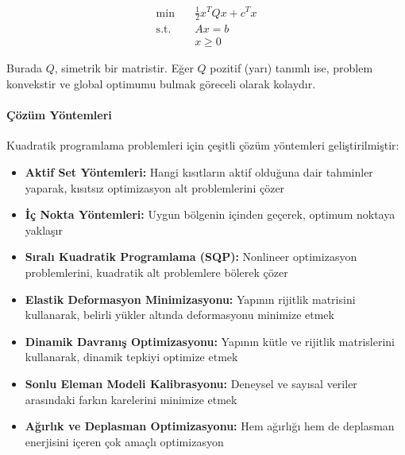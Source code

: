 \begin{equation}
\begin{aligned}
\min & \quad \frac{1}{2}x^TQx + c^Tx \\
\text{s.t.} & \quad Ax = b \\
& \quad x \geq 0
\end{aligned}
\end{equation}

Burada $Q$, simetrik bir matristir. Eğer $Q$ pozitif (yarı) tanımlı ise, problem konvekstir ve global optimumu bulmak göreceli olarak kolaydır.

\paragraph{Çözüm Yöntemleri}
Kuadratik programlama problemleri için çeşitli çözüm yöntemleri geliştirilmiştir:
\begin{itemize}
    \item \textbf{Aktif Set Yöntemleri:} Hangi kısıtların aktif olduğuna dair tahminler yaparak, kısıtsız optimizasyon alt problemlerini çözer
    
    \item \textbf{İç Nokta Yöntemleri:} Uygun bölgenin içinden geçerek, optimum noktaya yaklaşır
    
    \item \textbf{Sıralı Kuadratik Programlama (SQP):} Nonlineer optimizasyon problemlerini, kuadratik alt problemlere bölerek çözer
\end{itemize}



\begin{tcolorbox}[title=Yapısal Mühendislikte KP Uygulamaları]
\begin{itemize}
    \item \textbf{Elastik Deformasyon Minimizasyonu:} Yapının rijitlik matrisini kullanarak, belirli yükler altında deformasyonu minimize etmek
    
    \item \textbf{Dinamik Davranış Optimizasyonu:} Yapının kütle ve rijitlik matrislerini kullanarak, dinamik tepkiyi optimize etmek
    
    \item \textbf{Sonlu Eleman Modeli Kalibrasyonu:} Deneysel ve sayısal veriler arasındaki farkın karelerini minimize etmek
    
    \item \textbf{Ağırlık ve Deplasman Optimizasyonu:} Hem ağırlığı hem de deplasman enerjisini içeren çok amaçlı optimizasyon
\end{itemize}
\end{tcolorbox}

